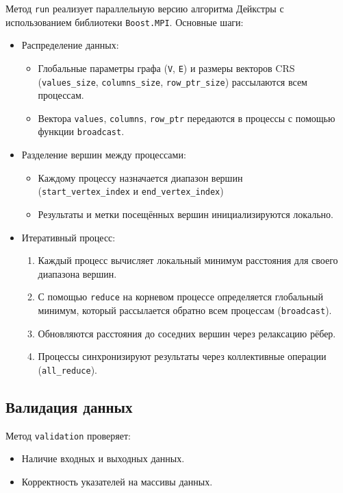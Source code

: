 \documentclass[a4paper,14pt]{extarticle}
\begin{document}
Метод \texttt{run} реализует параллельную версию алгоритма Дейкстры с использованием библиотеки \texttt{Boost.MPI}. Основные шаги:
\begin{itemize}
    \item Распределение данных:
    \begin{itemize}
        \item Глобальные параметры графа (\texttt{V}, \texttt{E}) и размеры векторов CRS (\texttt{values\_size}, \texttt{columns\_size}, \texttt{row\_ptr\_size}) рассылаются всем процессам.
        \item Вектора \texttt{values}, \texttt{columns}, \texttt{row\_ptr} передаются в процессы с помощью функции \texttt{broadcast}.
    \end{itemize}
    \item Разделение вершин между процессами:
    \begin{itemize}
       \item Каждому процессу назначается диапазон вершин \\
(\texttt{start\_vertex\_index} и \texttt{end\_vertex\_index})
        \item Результаты и метки посещённых вершин инициализируются локально.
    \end{itemize}
    \item Итеративный процесс:
    \begin{enumerate}
        \item Каждый процесс вычисляет локальный минимум расстояния для своего диапазона вершин.
        \item С помощью \texttt{reduce} на корневом процессе определяется глобальный минимум, который рассылается обратно всем процессам (\texttt{broadcast}).
        \item Обновляются расстояния до соседних вершин через релаксацию рёбер.
        \item Процессы синхронизируют результаты через коллективные операции (\texttt{all\_reduce}).
    \end{enumerate}
\end{itemize}

\subsection*{Валидация данных}

Метод \texttt{validation} проверяет:
\begin{itemize}
    \item Наличие входных и выходных данных.
    \item Корректность указателей на массивы данных.
\end{itemize}
\end{document}
